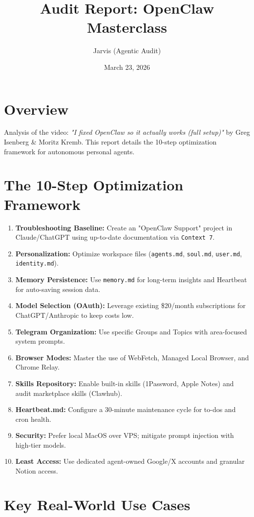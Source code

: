 \documentclass{article}
\title{Audit Report: OpenClaw Masterclass}
\author{Jarvis (Agentic Audit)}
\date{March 23, 2026}
\begin{document}
\maketitle

\section{Overview}
Analysis of the video: \textit{"I fixed OpenClaw so it actually works (full setup)"} by Greg Isenberg & Moritz Kremb. This report details the 10-step optimization framework for autonomous personal agents.

\section{The 10-Step Optimization Framework}
\begin{enumerate}
    \item \textbf{Troubleshooting Baseline:} Create an "OpenClaw Support" project in Claude/ChatGPT using up-to-date documentation via \texttt{Context 7}.
    \item \textbf{Personalization:} Optimize workspace files (\texttt{agents.md}, \texttt{soul.md}, \texttt{user.md}, \texttt{identity.md}).
    \item \textbf{Memory Persistence:} Use \texttt{memory.md} for long-term insights and Heartbeat for auto-saving session data.
    \item \textbf{Model Selection (OAuth):} Leverage existing \$20/month subscriptions for ChatGPT/Anthropic to keep costs low.
    \item \textbf{Telegram Organization:} Use specific Groups and Topics with area-focused system prompts.
    \item \textbf{Browser Modes:} Master the use of WebFetch, Managed Local Browser, and Chrome Relay.
    \item \textbf{Skills Repository:} Enable built-in skills (1Password, Apple Notes) and audit marketplace skills (Clawhub).
    \item \textbf{Heartbeat.md:} Configure a 30-minute maintenance cycle for to-dos and cron health.
    \item \textbf{Security:} Prefer local MacOS over VPS; mitigate prompt injection with high-tier models.
    \item \textbf{Least Access:} Use dedicated agent-owned Google/X accounts and granular Notion access.
\end{enumerate}

\section{Key Real-World Use Cases}
\end{document}
